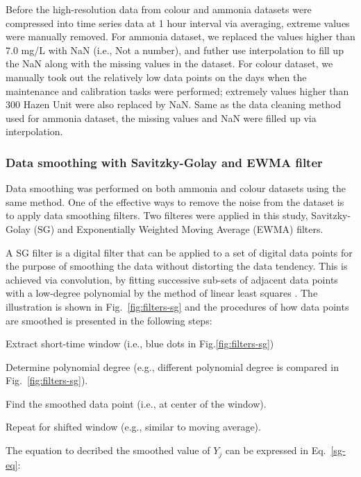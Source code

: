 Before the high-resolution data from colour and ammonia datasets were compressed into time series data at 1 hour interval via averaging, extreme values were manually removed. For ammonia dataset, we replaced the values higher than 7.0 mg/L with NaN (i.e., Not a number), and futher use interpolation to fill up the NaN along with the missing values in the dataset. For colour dataset, we manually took out the relatively low data points on the days when the maintenance and calibration tasks were performed; extremely values higher than 300 Hazen Unit were also replaced by NaN. Same as the data cleaning method used for ammonia dataset, the missing values and NaN were filled up via interpolation.

\subsubsection{Data smoothing with Savitzky-Golay and EWMA filter}
Data smoothing was performed on both ammonia and colour datasets using the same method. One of the effective ways to remove the noise from the dataset is to apply data smoothing filters. Two filteres were applied in this study, Savitzky-Golay (SG) and Exponentially Weighted Moving Average (EWMA) filters.

A SG filter is a digital filter that can be applied to a set of digital data points for the purpose of smoothing the data without distorting the data tendency. This is achieved via convolution, by fitting successive sub-sets of adjacent data points with a low-degree polynomial by the method of linear least squares \citep{wikipediaSavitzkyGolayFilter2022}. The illustration is shown in Fig.~\ref{fig:filters-sg} and the procedures of how data points are smoothed is presented in the following steps:

\noindent
\begin{myenumerate}
    \item Extract short-time window (i.e., blue dots in Fig.\ref{fig:filters-sg})
    \item Determine polynomial degree (e.g., different polynomial degree is compared in Fig.~\ref{fig:filters-sg}).
    \item Find the smoothed data point (i.e., at center of the window).
    \item Repeat for shifted window (e.g., similar to moving average).
\end{myenumerate}

The equation to decribed the smoothed value of \boldmath$Y_j$ can be expressed in Eq.~\ref{sg-eq}:

